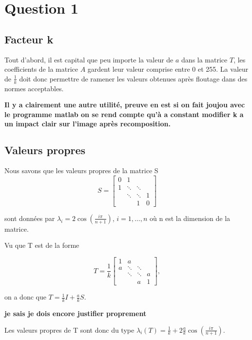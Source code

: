 \section{Question 1}

\subsection{Facteur k}
	Tout d'abord, il  est capital que peu importe la valeur de $\textit{a}$ dans la matrice $\textit{T}$, les coefficients de la matrice $\textit{A}$ gardent leur valeur comprise entre 0 et 255. La valeur de $\frac{1}{k}$ doit donc permettre de ramener les valeurs obtenues après floutage dans des normes acceptables.
	
\textbf{Il y a clairement une autre utilité, preuve en est si on fait joujou avec le programme matlab on se rend compte qu'à a constant modifier k a un impact clair sur l'image après recomposition.}	
	
\subsection{Valeurs propres}
	Nous savons que les valeurs propres de la matrice S 
	$$
S = 	
 \left[
 \begin{array}{cccc}
    0 & 1 		& 			& \\
    1 & \ddots 	& \ddots 	& \\
      & \ddots 	& \ddots 	& 1 \\
      & 		& 1			& 0
  \end{array}
  \right]
$$

sont données par $\lambda_i = 2 \cos(\frac{i\pi}{n+1})$, $i= 1, \ldots , n$ où n est la dimension de la matrice.

Vu que T est de la forme 

$$
 T = \frac{1}{k}
 \left[
 \begin{array}{cccc}
    1 & a 		& 			& \\
    a & \ddots 	& \ddots 	& \\
      & \ddots 	& \ddots 	& a \\
      & 		& a			& 1
  \end{array}
  \right] ,
$$

on a donc que $T = \frac{1}{k} I + \frac{a}{k} S$.

\textbf{je sais je dois encore justifier proprement}

Les valeurs propres de T sont donc du type $\lambda_i(T) = \frac{1}{k} + 2 \frac{a}{k} \cos(\frac{i\pi}{n+1})$.

